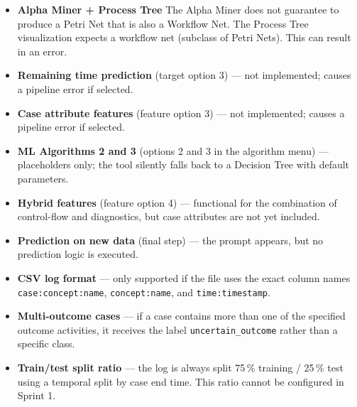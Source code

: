 \documentclass[12pt,a4paper]{article}
\begin{document}
\begin{itemize}
    \item \textbf{Alpha Miner + Process Tree} The Alpha Miner does not guarantee to produce a Petri Net that is also a Workflow Net. The Process Tree visualization expects a workflow net (subclass of Petri Nets). This can result in an error.
    \item \textbf{Remaining time prediction} (target option 3) --- not implemented; causes a pipeline error if selected.
    \item \textbf{Case attribute features} (feature option 3) --- not implemented; causes a pipeline error if selected.
    \item \textbf{ML Algorithms 2 and 3} (options 2 and 3 in the algorithm menu) --- placeholders only; the tool silently falls back to a Decision Tree with default parameters.
    \item \textbf{Hybrid features} (feature option 4) --- functional for the combination of control-flow and diagnostics, but case attributes are not yet included.
    \item \textbf{Prediction on new data} (final step) --- the prompt appears, but no prediction logic is executed.
    \item \textbf{CSV log format} --- only supported if the file uses the exact column names \verb|case:concept:name|, \verb|concept:name|, and \verb|time:timestamp|.
    \item \textbf{Multi-outcome cases} --- if a case contains more than one of the specified outcome activities, it receives the label \verb|uncertain_outcome| rather than a specific class.
    \item \textbf{Train/test split ratio} --- the log is always split 75\,\% training / 25\,\% test using a temporal split by case end time. This ratio cannot be configured in Sprint 1.
\end{itemize}
\end{document}

